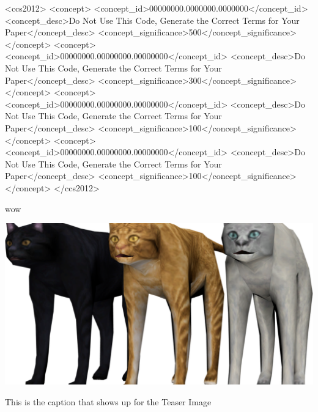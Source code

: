 \documentclass[sigconf, screen, review]{acmart}
\begin{document}
\begin{CCSXML}
	<ccs2012>
	<concept>
	<concept_id>00000000.0000000.0000000</concept_id>
	<concept_desc>Do Not Use This Code, Generate the Correct Terms for Your Paper</concept_desc>
	<concept_significance>500</concept_significance>
	</concept>
	<concept>
	<concept_id>00000000.00000000.00000000</concept_id>
	<concept_desc>Do Not Use This Code, Generate the Correct Terms for Your Paper</concept_desc>
	<concept_significance>300</concept_significance>
	</concept>
	<concept>
	<concept_id>00000000.00000000.00000000</concept_id>
	<concept_desc>Do Not Use This Code, Generate the Correct Terms for Your Paper</concept_desc>
	<concept_significance>100</concept_significance>
	</concept>
	<concept>
	<concept_id>00000000.00000000.00000000</concept_id>
	<concept_desc>Do Not Use This Code, Generate the Correct Terms for Your Paper</concept_desc>
	<concept_significance>100</concept_significance>
	</concept>
	</ccs2012>
\end{CCSXML}


\par wow
\begin{teaserfigure}
	\includegraphics[width=\textwidth]{images/example.png}
	\caption{This is the caption that shows up for the Teaser Image}
	\label{fig:teaser}
\end{teaserfigure}
\end{document}
